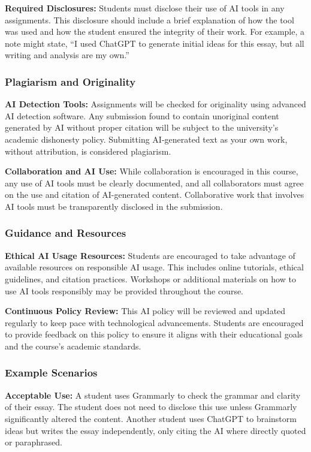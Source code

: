\documentclass[12pt, letterpaper]{article}
\begin{document}
\vspace{1ex}

\noindent\textbf{Required Disclosures:} Students must disclose their use of AI tools in any assignments. This disclosure should include a brief explanation of how the tool was used and how the student ensured the integrity of their work. For example, a note might state, “I used ChatGPT to generate initial ideas for this essay, but all writing and analysis are my own.”

\subsubsection*{Plagiarism and Originality}
\textbf{AI Detection Tools:} Assignments will be checked for originality using advanced AI detection software. Any submission found to contain unoriginal content generated by AI without proper citation will be subject to the university's academic dishonesty policy. Submitting AI-generated text as your own work, without attribution, is considered plagiarism.

\vspace{1ex}

\noindent\textbf{Collaboration and AI Use:} While collaboration is encouraged in this course, any use of AI tools must be clearly documented, and all collaborators must agree on the use and citation of AI-generated content. Collaborative work that involves AI tools must be transparently disclosed in the submission.

\subsubsection*{Guidance and Resources}
\textbf{Ethical AI Usage Resources:} Students are encouraged to take advantage of available resources on responsible AI usage. This includes online tutorials, ethical guidelines, and citation practices. Workshops or additional materials on how to use AI tools responsibly may be provided throughout the course.

\vspace{1ex}

\noindent\textbf{Continuous Policy Review:} This AI policy will be reviewed and updated regularly to keep pace with technological advancements. Students are encouraged to provide feedback on this policy to ensure it aligns with their educational goals and the course's academic standards.

\subsubsection*{Example Scenarios}
\textbf{Acceptable Use:} A student uses Grammarly to check the grammar and clarity of their essay. The student does not need to disclose this use unless Grammarly significantly altered the content. Another student uses ChatGPT to brainstorm ideas but writes the essay independently, only citing the AI where directly quoted or paraphrased.
\end{document}
